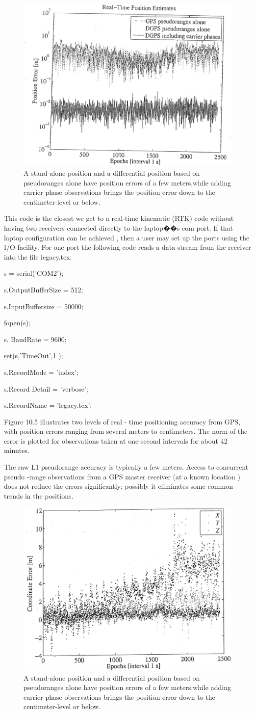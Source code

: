 \begin{figure}
	\centering
	\includegraphics[width=0.4\linewidth]{TeX_files/Part03/chapter10/image/9-5}
	\caption{A stand-alone position and a differential position based on pseudoranges alone have position errors of a few meters,while adding carrier phase observations brings the position error down to the centimeter-level or below.}
	\label{fig:9-5}
\end{figure}

This code is the closest we get to a real-time kinematic (RTK) code without having two receivers connected directly to the laptop��s com port. If that laptop configuration can be achieved , then a user may set up the ports using the I/O facility. For one port the following code reads a data stream from the receiver into the file legacy.tex:

s = serial('COM2');

s.OutputBufferSize = 512;

s.InputBuffersize = 50000;

fopen(s);

s. BaudRate = 9600;

set(s,'TimeOut',1 );

s.RecordMode = 'index';

s.Record Detail = 'verbose';

s.RecordName = 'legacy.tex';

Figure 10.5 illustrates two levels of real - time positioning accuracy from GPS, with position errors ranging from several meters to centimeters. The norm of the error is plotted for observations taken at one-second intervals for about 42 minutes.

The raw L1 pseudorange accuracy is typically a few meters. Access to concurrent pseudo -range observations from a GPS master receiver (at a known location ) does not reduce the errors significantly; possibly it eliminates some common trends in the positions.

\begin{figure}
	\centering
	\includegraphics[width=0.4\linewidth]{TeX_files/Part03/chapter10/image/9-6}
	\caption{A stand-alone position and a differential position based on pseudoranges alone have position errors of a few meters,while adding carrier phase observations brings the position error down to the centimeter-level or below.}
	\label{fig:9-6}
\end{figure}

